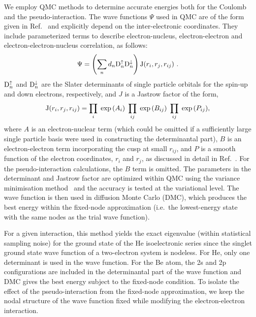 We employ QMC methods to determine accurate energies 
both for the Coulomb and the pseudo-interaction.
The wave functions $\Psi$ used in QMC are of the form given 
in Ref.~\cite{Fil-Umr} and explicitly depend on the 
inter-electronic coordinates. 
They include parameterized terms to describe electron-nucleus, 
electron-electron and electron-electron-nucleus correlation, 
as follows:
\begin{eqnarray}
\Psi=\left(\sum_n d_n {\rm D}^\uparrow_n {\rm D}^\downarrow_n\right)
{\rm J}(r_i, r_j, r_{ij}) ~. 
\label{eq:jast_slt}
\end{eqnarray}
${\rm D}^\uparrow_n$ and ${\rm D}^\downarrow_n$ are the Slater 
determinants of single particle orbitals for the spin-up and down 
electrons, respectively, and $J$ is a Jastrow factor of the form,
\begin{eqnarray}
{\rm J}(r_i,r_j,r_{ij})=\prod_{i} \;\exp{(A_{i})}
\;\prod_{ij}\;\exp{(B_{ij})} \;\prod_{ij}\;\exp{(P_{ij})},
\end{eqnarray}
where $A$ is an electron-nuclear term (which could be omitted if
a sufficiently large single particle basis were used in constructing
the determinantal part), $B$ is an electron-electron term 
incorporating the cusp at small $r_{ij}$, and $P$ is a smooth
function of the electron coordinates, $r_i$ and $r_j$, as 
discussed in detail in Ref.~\cite{Fil-Umr}.
For the pseudo-interaction calculations, the $B$ term is omitted.
The parameters in the determinant and Jastrow factor are optimized 
within QMC using the variance minimisation method~\cite{Cyrus:varmin} 
and the accuracy is tested at the variational level.
The wave function is then used in diffusion Monte Carlo (DMC), 
which produces the best energy within the fixed-node approximation 
(i.e.\ the lowest-energy state with the same nodes as the trial wave 
function).

For a given interaction, this method yields the exact eigenvalue (within 
statistical sampling noise) for the ground state of the He isoelectronic 
series since the singlet ground state wave function of a two-electron system 
is nodeless.
For He, only one determinant is used in the wave function.
For the Be atom,  the 2s and 2p configurations are included in
the determinantal part of the wave function and DMC gives the best 
energy subject to the fixed-node condition. 
To isolate the effect of the pseudo-interaction from the fixed-node 
approximation, we keep the nodal structure of the wave 
function fixed while modifying the electron-electron interaction.

